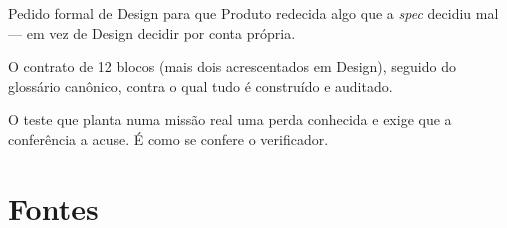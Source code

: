 \documentclass[11pt,a4paper]{article}
\begin{document}
\begin{description}[leftmargin=3.5cm,style=sameline,font=\sffamily\bfseries\color{unNavy},itemsep=3pt]
  \item[Re-\emph{spec}] Pedido formal de Design para que Produto redecida algo que a \emph{spec} decidiu mal --- em vez de Design decidir por conta própria.
  \item[\emph{Spec} da missão] O contrato de 12 blocos (mais dois acrescentados em Design), seguido do glossário canônico, contra o qual tudo é construído e auditado.
  \item[Teste de mutação] O teste que planta numa missão real uma perda conhecida e exige que a conferência a acuse. É como se confere o verificador.
\end{description}

\section{Fontes}
\end{document}
